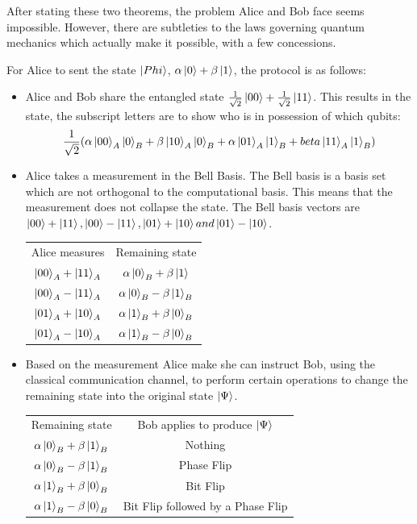 After stating these two theorems, the problem Alice and Bob face seems impossible.
However, there are subtleties to the laws governing quantum mechanics which actually make it possible, with a few concessions.

For Alice to sent the state $\left\vert{Phi}\right\rangle$, $\alpha\left\vert{0}\right\rangle+\beta\left\vert{1}\right\rangle$, the protocol is as follows:
\begin{itemize}
 \item Alice and Bob share the entangled state $\frac{1}{\sqrt{2}}\left\vert{00}\right\rangle+\frac{1}{\sqrt{2}}\left\vert{11}\right\rangle$.
This results in the state, the subscript letters are to show who is in possession of which qubits:
\begin{equation}
 \frac{1}{\sqrt{2}}(\alpha\left\vert{00}\right\rangle_A\left\vert{0}\right\rangle_B+\beta\left\vert{10}\right\rangle_A\left\vert{0}\right\rangle_B+\alpha\left\vert{01}\right\rangle_A\left\vert{1}\right\rangle_B+beta\left\vert{11}\right\rangle_A\left\vert{1}\right\rangle_B)
\end{equation}
\item Alice takes a measurement in the Bell Basis.
The Bell basis is a basis set which are not orthogonal to the computational basis.
This means that the measurement does not collapse the state.
The Bell basis vectors are $\left\vert{00}\right\rangle+\left\vert{11}\right\rangle, \left\vert{00}\right\rangle-\left\vert{11}\right\rangle, \left\vert{01}\right\rangle+\left\vert{10}\right\rangle and \left\vert{01}\right\rangle-\left\vert{10}\right\rangle$.
\begin{center}
\begin{tabular}{cc}
Alice measures & Remaining state\\
$\left\vert{00}\right\rangle_A+\left\vert{11}\right\rangle_A$ & $\alpha\left\vert{0}\right\rangle_B+\beta\left\vert{1}\right\rangle$\\
$\left\vert{00}\right\rangle_A-\left\vert{11}\right\rangle_A$ & $\alpha\left\vert{0}\right\rangle_B-\beta\left\vert{1}\right\rangle_B$\\
$\left\vert{01}\right\rangle_A+\left\vert{10}\right\rangle_A$ & $\alpha\left\vert{1}\right\rangle_B+\beta\left\vert{0}\right\rangle_B$\\
$\left\vert{01}\right\rangle_A-\left\vert{10}\right\rangle_A$ & $\alpha\left\vert{1}\right\rangle_B-\beta\left\vert{0}\right\rangle_B$
\end{tabular}
\end{center}

\item Based on the measurement Alice make she can instruct Bob, using the classical communication channel, to perform certain operations to change the remaining state into the original state $\left\vert{\Psi}\right\rangle$.
\begin{center}
\begin{tabular}{cc}
Remaining state & Bob applies to produce $\left\vert{\Psi}\right\rangle$\\
$\alpha\left\vert{0}\right\rangle_B+\beta\left\vert{1}\right\rangle_B$ & Nothing\\
$\alpha\left\vert{0}\right\rangle_B-\beta\left\vert{1}\right\rangle_B$ & Phase Flip\\
$\alpha\left\vert{1}\right\rangle_B+\beta\left\vert{0}\right\rangle_B$ & Bit Flip\\
$\alpha\left\vert{1}\right\rangle_B-\beta\left\vert{0}\right\rangle_B$ & Bit Flip followed by a Phase Flip
\end{tabular}
\end{center}
\end{itemize}

